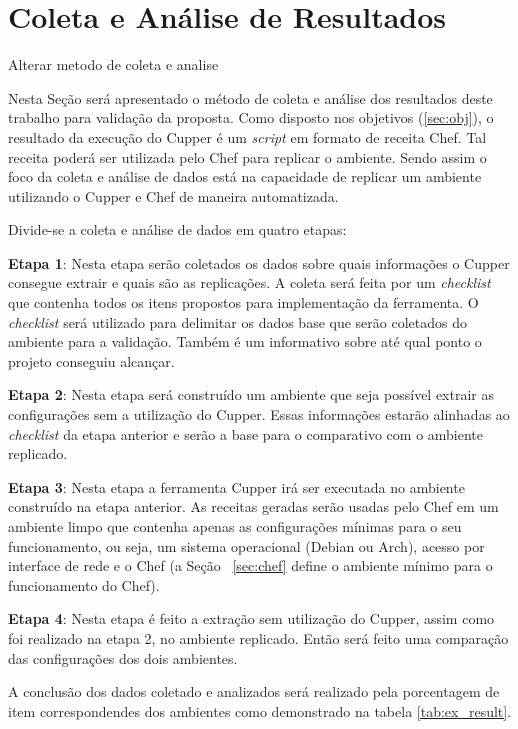 \section{Coleta e Análise de Resultados}

{\color{red} Alterar metodo de coleta e analise}

Nesta Seção será apresentado o método de coleta e análise dos resultados deste %
trabalho para validação da proposta. Como disposto nos objetivos (\ref{sec:obj}),
o resultado da execução do Cupper é um \textit{script} em formato de receita Chef.
Tal receita poderá ser utilizada pelo Chef para replicar o ambiente. Sendo assim
o foco da coleta e análise de dados está na capacidade de replicar um ambiente
utilizando o Cupper e Chef de maneira automatizada.

Divide-se a coleta e análise de dados em quatro etapas:

\textbf{Etapa 1}: Nesta etapa serão coletados os dados sobre quais informações o Cupper consegue
extrair e quais são as replicações. A coleta será feita por um \textit{checklist} que contenha
todos os itens propostos para implementação da ferramenta. O \textit{checklist} será
utilizado para delimitar os dados base que serão coletados do ambiente para
a validação. Também é um informativo sobre até qual ponto o projeto conseguiu
alcançar.

\textbf{Etapa 2}: Nesta etapa será construído um ambiente que seja possível extrair as configurações
sem a utilização do Cupper. Essas informações estarão alinhadas ao \textit{checklist} da etapa
anterior e serão a base para o comparativo com o ambiente replicado.

\textbf{Etapa 3}: Nesta etapa a ferramenta Cupper irá ser executada no ambiente construído na etapa
anterior. As receitas geradas serão usadas pelo Chef em um ambiente limpo que contenha
apenas as configurações mínimas para o seu funcionamento, ou seja, um sistema
operacional (Debian ou Arch), acesso por interface de rede e o Chef (a Seção
~\ref{sec:chef} define o ambiente mínimo para o funcionamento do Chef).

\textbf{Etapa 4}: Nesta etapa é feito a extração sem utilização do Cupper, assim como foi realizado
na etapa 2, no ambiente replicado. Então será feito uma comparação das configurações
dos dois ambientes.

A conclusão dos dados coletado e analizados será realizado pela porcentagem de
item correspondendes dos ambientes como demonstrado na tabela \ref{tab:ex_result}.

